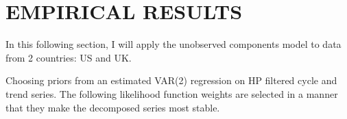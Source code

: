 \documentclass[
  12pt,
]{article}
\begin{document}
\begin{table}[H]
\begin{threeparttable}
\begin{tabular}{@{}ll@{}}
                    \bottomrule
                \end{tabular}
            \end{threeparttable}
        \end{table}

\hypertarget{empirical-results}{%
\section{EMPIRICAL RESULTS}\label{empirical-results}}

        In this following section, I will apply the unobserved components model to data from 2 countries: US and UK.
        
Choosing priors from an estimated VAR(2) regression on HP filtered cycle and trend series. The following likelihood function weights are selected in a manner that they make the decomposed series most stable. 
        
\end{document}
